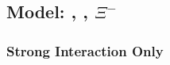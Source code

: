 \documentclass[/home/jesse/Analysis/FemtoAnalysis/AnalysisNotes/AnalysisNoteJBuxton.tex]{subfiles}
\begin{document}
\subsection{Model: \LamKs, \LamKpm, $\Xi^{-}$\Ks}
\label{ModelLambdaKaon}

\subsubsection*{Strong Interaction Only}
\label{StrongIntOnly}

\begin{comment}
The Bethe-Salpeter(?) amplitude for interacting particles is given by

\begin{equation}
\psi = e^{-iP(x_{1}+x_{2})/2}\left( e^{-ikr} + \phi_{p_{1}p_{2}}(r) \right)
\label{eqn:TempEq1}
\end{equation}
where $\phi_{p_{1}p_{2}}(r)$ describes the FSI of the particles. 
More specifically,  $\phi_{p_{1}p_{2}}(r)$ can be calculated as:

\begin{equation}
\begin{aligned}
\phi_{p_{1}p_{2}}(x) = \frac{8\pi\sqrt{p^{2}}}{(2\pi)^{4}i}e^{ipx}\int \frac{e^{-i\kappa x}f(p_{1}, p_{2}, \kappa, 2p-\kappa)}{(\kappa^{2}-m_{1}^{2})((2p-\kappa)^2 - m_{2}^{2})}d^{4}\kappa
\end{aligned}
\end{equation}


Range of potential smaller than r $\rightarrow$ $f(p_{1}, p_{2}, \kappa, 2p-\kappa) \approx f(k^{*})$, and we can pull it out of the integral.

\begin{equation}
\begin{aligned}
\phi_{p_{1}p_{2}}(x) = f(k^{*}) \Phi_{p_{1}p_{2}}(x)
\end{aligned}
\end{equation}

In the effective range approximation, $f(k^{*})$ is of the form:

\begin{equation}
\begin{aligned}
f(k^{*}) = \left( \frac{1}{f_{0}} + \frac{1}{2}d_{0}k^{*2} - ik^{*} \right)^{-1}
\end{aligned}
\label{eqn:ScatteringParam}
\end{equation}



Furthermore, for $k* << m$,  and particles emitted at same time in the PRF, $\Phi_{p_{1}p_{2}}(x)$ reduces to
\begin{equation}
\begin{aligned}
\Phi_{p_{1}p_{2}}(x) = \frac{e^{ik^{*}r^{*}}}{r^{*}}
\end{aligned}
\label{eqn:PhiP1P2SphericalWave}
\end{equation}
\end{comment}
\end{document}
